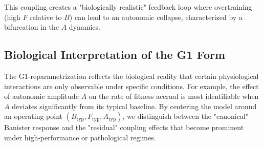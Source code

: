 This coupling creates a "biologically realistic" feedback loop where overtraining (high \(F\) relative to \(B\)) can lead to an autonomic collapse, characterized by a bifurcation in the \(A\) dynamics.

\subsection{Biological Interpretation of the G1 Form}

The G1-reparametrization reflects the biological reality that certain physiological interactions are only observable under specific conditions. For example, the effect of autonomic amplitude \(A\) on the rate of fitness accrual is most identifiable when \(A\) deviates significantly from its typical baseline. By centering the model around an operating point \((B_{\mathrm{typ}}, F_{\mathrm{typ}}, A_{\mathrm{typ}})\), we distinguish between the "canonical" Banister response and the "residual" coupling effects that become prominent under high-performance or pathological regimes.
